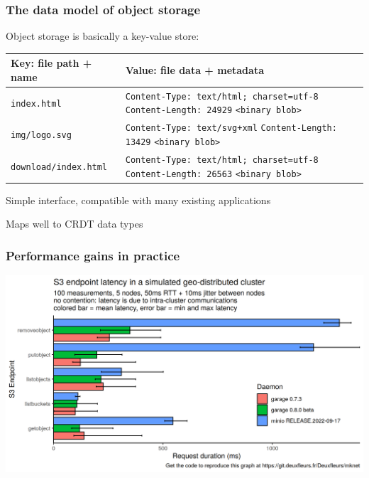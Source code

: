 \documentclass[aspectratio=169]{beamer}
\begin{document}
\begin{frame}
	\frametitle{The data model of object storage}
	Object storage is basically a key-value store:
	\vspace{1em}

	{\footnotesize
		\begin{center}
		\begin{tabular}{|l|p{8cm}|}
			\hline
			\textbf{Key: file path + name} & \textbf{Value: file data + metadata} \\
			\hline
			\hline
			\texttt{index.html} &
				\texttt{Content-Type: text/html; charset=utf-8} \newline
				\texttt{Content-Length: 24929} \newline
				\texttt{<binary blob>} \\ 
			\hline
			\texttt{img/logo.svg} &
				\texttt{Content-Type: text/svg+xml} \newline
				\texttt{Content-Length: 13429} \newline
				\texttt{<binary blob>} \\ 
			\hline
			\texttt{download/index.html} &
				\texttt{Content-Type: text/html; charset=utf-8} \newline
				\texttt{Content-Length: 26563} \newline
				\texttt{<binary blob>} \\ 
			\hline
		\end{tabular}
		\end{center}
		}

	\vspace{1em}
	Simple interface, compatible with many existing applications

	\vspace{1em}
	Maps well to CRDT data types
\end{frame}

\begin{frame}
	\frametitle{Performance gains in practice}
	\begin{center}
		\includegraphics[width=.8\linewidth]{../assets/endpoint_latency_0.7_0.8_minio.png}
	\end{center}
\end{frame}
\end{document}
